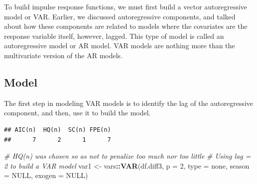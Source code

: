 \documentclass[
]{article}
\newenvironment{Shaded}{\begin{snugshade}}{\end{snugshade}}
\newcommand{\AttributeTok}[1]{\textcolor[rgb]{0.13,0.29,0.53}{#1}}
\newcommand{\CommentTok}[1]{\textcolor[rgb]{0.56,0.35,0.01}{\textit{#1}}}
\newcommand{\ConstantTok}[1]{\textcolor[rgb]{0.56,0.35,0.01}{#1}}
\newcommand{\DecValTok}[1]{\textcolor[rgb]{0.00,0.00,0.81}{#1}}
\newcommand{\FunctionTok}[1]{\textcolor[rgb]{0.13,0.29,0.53}{\textbf{#1}}}
\newcommand{\NormalTok}[1]{#1}
\newcommand{\OtherTok}[1]{\textcolor[rgb]{0.56,0.35,0.01}{#1}}
\newcommand{\SpecialCharTok}[1]{\textcolor[rgb]{0.81,0.36,0.00}{\textbf{#1}}}
\newcommand{\StringTok}[1]{\textcolor[rgb]{0.31,0.60,0.02}{#1}}
\renewenvironment{Shaded}{\begin{mdframed}[ backgroundcolor=shadecolor, linecolor = shadecolor, leftmargin=\dimexpr\leftmargin-2pt\relax, innerleftmargin=1.6pt, innertopmargin=5pt, skipabove=10pt,skipbelow=3pt ]}{\end{mdframed}}
\begin{document}
To build impulse response functions, we must first build a vector
autoregressive model or VAR. Earlier, we discussed autoregressive
components, and talked about how these components are related to models
where the covariates are the response variable itself, however, lagged.
This type of model is called an autoregressive model or AR model. VAR
models are nothing more than the multivariate version of the AR models.

\subsection{Model}\label{model}

The first step in modeling VAR models is to identify the lag of the
autoregressive component, and then, use it to build the model.

\begin{Shaded}
\end{Shaded}

\begin{verbatim}
## AIC(n)  HQ(n)  SC(n) FPE(n) 
##      7      2      1      7
\end{verbatim}

\begin{Shaded}
\begin{Highlighting}[]
\CommentTok{\# HQ(n) was chosen so as not to penalize too much nor too little}
\CommentTok{\# Using lag = 2 to build a VAR model}
\NormalTok{var1 }\OtherTok{\textless{}{-}}\NormalTok{  vars}\SpecialCharTok{::}\FunctionTok{VAR}\NormalTok{(df.diff3, }
                   \AttributeTok{p =} \DecValTok{2}\NormalTok{,}
                   \AttributeTok{type =} \StringTok{\textquotesingle{}none\textquotesingle{}}\NormalTok{,}
                   \AttributeTok{season =} \ConstantTok{NULL}\NormalTok{,}
                   \AttributeTok{exogen =} \ConstantTok{NULL}\NormalTok{)}
\end{Highlighting}
\end{Shaded}
\end{document}
